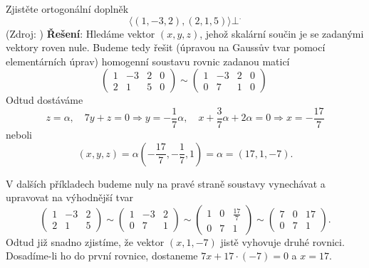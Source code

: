       \begin{example}\label{LA:exam_ort_doplnek01}
        Zjistěte ortogonální doplněk $$\langle(1,-3,2),(2,1,5)\rangle\bot^.$$ (Zdroj:
        \protect\cite[s.~3]{MosnaMA3}) \newline\textbf{Řešení}:
          Hledáme vektor $(x, y, z)$, jehož skalární součin je se zadanými vektory roven nule. Budeme
          tedy řešit (úpravou na Gaussův tvar pomocí elementárních úprav) homogenní soustavu rovnic
          zadanou maticí
          \begin{equation*}
             \left(
               \begin{array}{ccc|c}
                  1  &  -3  & 2 & 0 \\
                  2  &   1  & 5 & 0
               \end{array}
             \right)\sim
             \left(
               \begin{array}{ccc|c}
                  1  &  -3  & 2 & 0 \\
                  0  &   7  & 1 & 0
               \end{array}
             \right)\
          \end{equation*}
          Odtud dostáváme $$z = \alpha,\quad 7y + z = 0 \Rightarrow y = -\frac{1}{7}\alpha, \quad x
          +\frac{3}{7}\alpha + 2\alpha = 0 \Rightarrow x = -\frac{17}{7}$$ neboli $$(x, y, z) =
          \alpha\left(-\frac{17}{7}, -\frac{1}{7}, 1\right) = \alpha = (17, 1, -7).$$
  
          V dalších příkladech budeme nuly na pravé straně soustavy vynechávat a upravovat na
          výhodnější tvar
          \begin{equation*}
             \left(
               \begin{array}{ccc}
                  1  &  -3  & 2  \\
                  2  &   1  & 5
               \end{array}
             \right)\sim
             \left(
               \begin{array}{ccc}
                  1  &  -3  & 2 \\
                  0  &   7  & 1
               \end{array}
             \right)\sim
             \left(
               \begin{array}{ccc}
                  1  &   0  & \frac{17}{7}  \\
                  0  &   7  & 1
               \end{array}
             \right)\sim
             \left(
               \begin{array}{ccc}
                  7  &   0  & 17 \\
                  0  &   7  & 1
               \end{array}
             \right).
          \end{equation*}
          Odtud již snadno zjistíme, že vektor $(x, 1, -7)$ jistě vyhovuje druhé rovnici.
          Do\-sa\-dí\-me-li ho do první rovnice, dostaneme $7x + 17\cdot(-7) = 0$ a $x = 17$.
  

\end{example}
